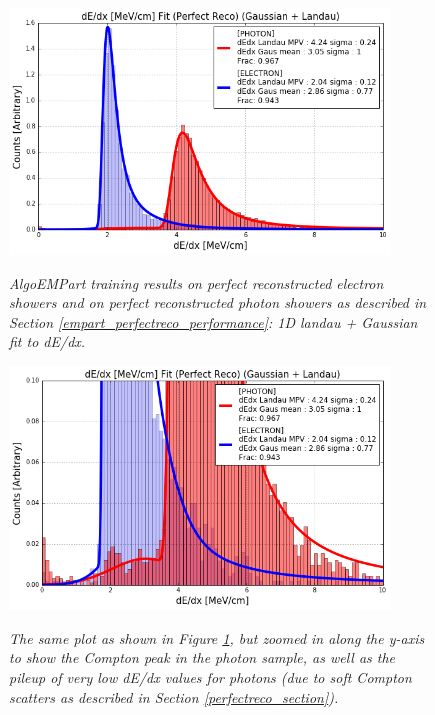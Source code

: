 \begin{figure}[ht!]
\centering
\includegraphics[width=0.9\textwidth]{Figures/EMPartTraining/mc_trained/dEdx_Selected_both.png}\\
\caption{\textit{AlgoEMPart training results on perfect reconstructed electron showers and on perfect reconstructed photon showers as described in Section \ref{empart_perfectreco_performance}: 1D landau + Gaussian fit to dE/dx.}}
\label{empart_perfectreco_performance_fig2}
\end{figure}

\begin{figure}[ht!]
\centering
\includegraphics[width=0.9\textwidth]{Figures/EMPartTraining/mc_trained/dEdx_Selected_both_zoomed.png}\\
\caption{\textit{The same plot as shown in Figure \ref{empart_perfectreco_performance_fig2}, but zoomed in along the y-axis to show the Compton peak in the photon sample, as well as the pileup of very low dE/dx values for photons (due to soft Compton scatters as described in Section \ref{perfectreco_section}).}}
\label{empart_perfectreco_performance_fig3}
\end{figure}

